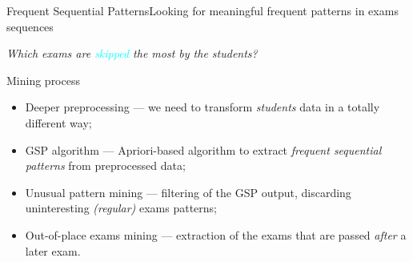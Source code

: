 \begin{frame}{Frequent Sequential Patterns}{Looking for meaningful frequent patterns in exams sequences}

     \vspace{0,1cm}\centering\textit{Which exams are \textcolor{cyan}{skipped} the most by the students?} \vspace{0,1cm}

\begin{block}{Mining process}
		\begin{itemize}
			\item<1-> \alert{Deeper preprocessing} --- we need to transform \emph{students} data in a totally different way;\vspace{0.2cm}
			\item<2-> \alert{GSP algorithm} --- Apriori-based algorithm to extract \emph{frequent sequential patterns} from preprocessed data;\vspace{0.2cm}
			\item<3-> \alert{Unusual pattern mining} --- filtering of the GSP output, discarding uninteresting \emph{(regular)} exams patterns;\vspace{0.2cm}
			\item<4-> \alert{Out-of-place exams mining} --- extraction of the exams that are passed \emph{after} a later exam.
		\end{itemize}
	\end{block}

\end{frame}

